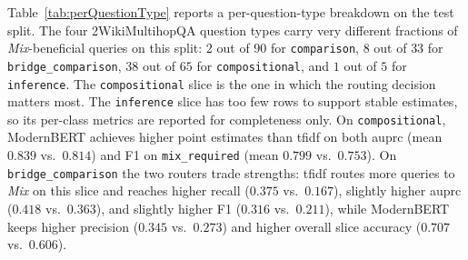 \documentclass[english, bibtex]{kththesis}               %
\numberwithin{listing}{chapter}
\begin{document}
Table~\ref{tab:perQuestionType} reports a per-question-type breakdown on the test split. The four 2WikiMultihopQA question types carry very different fractions of \emph{Mix}-beneficial queries on this split: $2$ out of $90$ for \texttt{comparison}, $8$ out of $33$ for \texttt{bridge\_comparison}, $38$ out of $65$ for \texttt{compositional}, and $1$ out of $5$ for \texttt{inference}. The \texttt{compositional} slice is the one in which the routing decision matters most. The \texttt{inference} slice has too few rows to support stable estimates, so its per-class metrics are reported for completeness only. On \texttt{compositional}, ModernBERT achieves higher point estimates than \gls{tfidf} on both \gls{auprc} (mean $0.839$ vs.\ $0.814$) and F1 on \texttt{mix\_required} (mean $0.799$ vs.\ $0.753$). On \texttt{bridge\_comparison} the two routers trade strengths: \gls{tfidf} routes more queries to \emph{Mix} on this slice and reaches higher recall ($0.375$ vs.\ $0.167$), slightly higher \gls{auprc} ($0.418$ vs.\ $0.363$), and slightly higher F1 ($0.316$ vs.\ $0.211$), while ModernBERT keeps higher precision ($0.345$ vs.\ $0.273$) and higher overall slice accuracy ($0.707$ vs.\ $0.606$).
\end{document}
